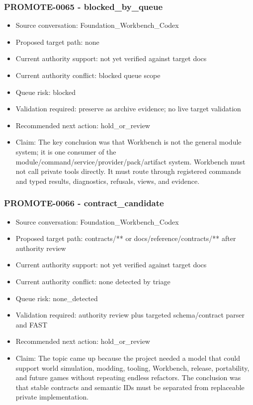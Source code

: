 \documentclass[11pt,a4paper]{report}
\begin{document}
\subsubsection{PROMOTE-0065 - blocked\_by\_queue}

\begin{itemize}
\item Source conversation: Foundation\_Workbench\_Codex
\item Proposed target path: none
\item Current authority support: not yet verified against target docs
\item Current authority conflict: blocked queue scope
\item Queue risk: blocked
\item Validation required: preserve as archive evidence; no live target validation
\item Recommended next action: hold\_or\_review
\item Claim: The key conclusion was that Workbench is not the general module system; it is one consumer of the module/command/service/provider/pack/artifact system. Workbench must not call private tools directly. It must route through registered commands and typed results, diagnostics, refusals, views, and evidence.
\end{itemize}

\subsubsection{PROMOTE-0066 - contract\_candidate}

\begin{itemize}
\item Source conversation: Foundation\_Workbench\_Codex
\item Proposed target path: contracts/** or docs/reference/contracts/** after authority review
\item Current authority support: not yet verified against target docs
\item Current authority conflict: none detected by triage
\item Queue risk: none\_detected
\item Validation required: authority review plus targeted schema/contract parser and FAST
\item Recommended next action: hold\_or\_review
\item Claim: The topic came up because the project needed a model that could support world simulation, modding, tooling, Workbench, release, portability, and future games without repeating endless refactors. The conclusion was that stable contracts and semantic IDs must be separated from replaceable private implementation.
\end{itemize}
\end{document}
